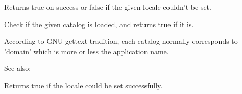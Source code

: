 Returns true on success or false if the given locale couldn't be set.


\label{wxlocaleisloaded}


Check if the given catalog is loaded, and returns true if it is.

According to GNU gettext tradition, each catalog
normally corresponds to 'domain' which is more or less the application name.

See also: 


\label{wxlocaleisok}


Returns true if the locale could be set successfully.

